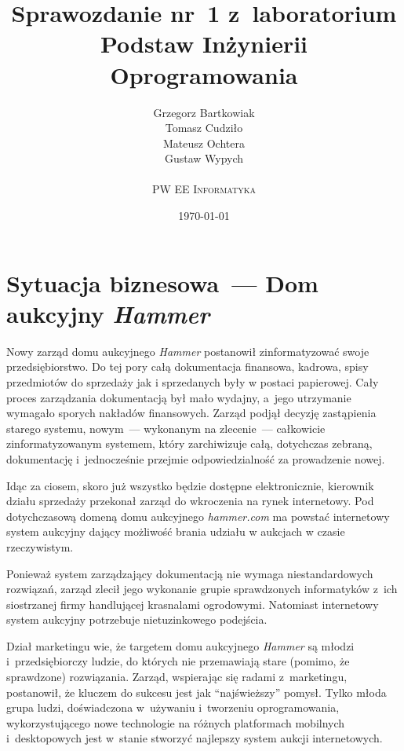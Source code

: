 \documentclass[10pt,a4paper]{article}
\begin{document}
\title{
  Sprawozdanie nr~1 z~laboratorium\\Podstaw Inżynierii Oprogramowania
}
\author{
  Grzegorz Bartkowiak\\
  Tomasz Cudziło\\
  Mateusz Ochtera\\
  Gustaw Wypych\\
  \\
  \textsc{PW EE Informatyka}\\[10pt]
}
\date{\today}

\maketitle

\section{Sytuacja biznesowa~--- Dom aukcyjny \emph{Hammer}}
Nowy zarząd domu aukcyjnego \emph{Hammer} postanowił zinformatyzować swoje
przedsiębiorstwo. Do tej pory całą dokumentacja finansowa, kadrowa, spisy
przedmiotów do sprzedaży jak i sprzedanych były w postaci papierowej. Cały
proces zarządzania dokumentacją był mało wydajny, a~jego utrzymanie wymagało
sporych nakładów finansowych. Zarząd podjął decyzję zastąpienia starego
systemu, nowym~--- wykonanym na zlecenie~--- całkowicie zinformatyzowanym
systemem, który zarchiwizuje całą, dotychczas zebraną, dokumentację
i~jednocześnie przejmie odpowiedzialność za prowadzenie nowej.

Idąc za ciosem, skoro już wszystko będzie dostępne elektronicznie, kierownik
działu sprzedaży przekonał zarząd do wkroczenia na rynek internetowy. Pod
dotychczasową domeną domu aukcyjnego \emph{hammer.com} ma powstać
internetowy system aukcyjny dający możliwość brania udziału w aukcjach w czasie
rzeczywistym.

Ponieważ system zarządzający dokumentacją nie wymaga niestandardowych
rozwiązań, zarząd zlecił jego wykonanie grupie sprawdzonych informatyków z~ich
siostrzanej firmy handlującej krasnalami ogrodowymi. Natomiast internetowy
system aukcyjny potrzebuje nietuzinkowego podejścia.

Dział marketingu wie, że targetem domu aukcyjnego \emph{Hammer} są młodzi
i~przedsiębiorczy ludzie, do których nie przemawiają stare (pomimo, że
sprawdzone) rozwiązania. Zarząd, wspierając się radami z~marketingu,
postanowił, że kluczem do sukcesu jest jak ``najświeższy'' pomysł. Tylko młoda
grupa ludzi, doświadczona w~używaniu i~tworzeniu oprogramowania,
wykorzystującego nowe technologie na różnych platformach mobilnych
i~desktopowych jest w~stanie stworzyć najlepszy system aukcji internetowych.
\end{document}

